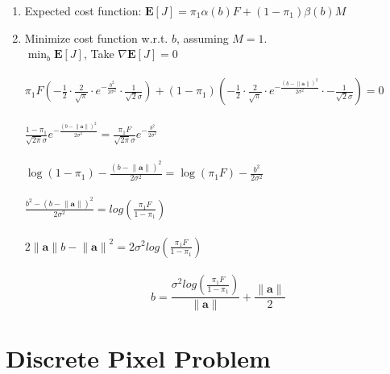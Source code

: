 \documentclass[11pt]{article}
\begin{document}
\begin{enumerate}
    \item Expected cost function: $\mathbf{E}[J] = \pi_1\alpha(b)F+(1-\pi_1)\beta(b)M$
    \item Minimize cost function w.r.t. $b$, assuming $M=1$.\\
    $\min_b \mathbf{E}[J]$, Take $\nabla \mathbf{E}[J] = 0$\\\\
    $\pi_1 F(-\frac{1}{2}\cdot\frac{2}{\sqrt{\pi}}\cdot e^{-\frac{b^2}{2\sigma^2}}\cdot \frac{1}{\sqrt{2}\sigma}) +
    (1-\pi_1)(-\frac{1}{2}\cdot\frac{2}{\sqrt{\pi}}\cdot e^{-\frac{{(b-\lVert \mathbf{a} \rVert)}^2}{2\sigma^2}}\cdot -\frac{1}{\sqrt{2}\sigma})=0$\\\\
    $\frac{1-\pi_1}{\sqrt{2\pi}\sigma} e^{-\frac{{(b-\lVert \mathbf{a} \rVert)}^2}{2\sigma^2}} = \frac{\pi_1 F}{\sqrt{2\pi}\sigma} e^{-\frac{b^2}{2\sigma^2}}$\\\\
    $\log{(1-\pi_1)}-\frac{{(b-\lVert \mathbf{a} \rVert)}^2}{2\sigma^2} =
    \log{(\pi_1F)}-\frac{b^2}{2\sigma^2}$\\\\
    $\frac{b^2-{(b-\lVert \mathbf{a} \rVert)}^2}{2\sigma^2} = log{(\frac{\pi_1F}{1-\pi_1})}$\\\\
    $2\lVert \mathbf{a} \rVert b - {\lVert \mathbf{a} \rVert}^2 = 2\sigma^2log{(\frac{\pi_1F}{1-\pi_1})}$\\\\
    \begin{equation}
        b = \frac{\sigma^2log{(\frac{\pi_1F}{1-\pi_1})}}{\lVert \mathbf{a} \rVert} + \frac{\lVert \mathbf{a} \rVert}{2}
    \end{equation}
    
\end{enumerate}


\section{Discrete Pixel Problem}
\end{document}
